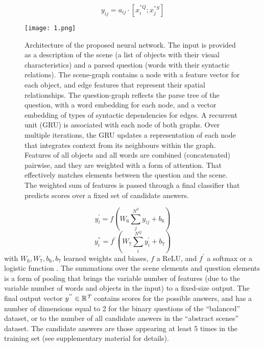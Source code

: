 \documentclass[10pt,twocolumn,a4paper]{article}
\begin{document}
  \begin{equation}
  y_{ij}=a_{ij}\cdot \left[x_i^{''Q};x_j^{''S} \right]
  \label{eq1}
  \end{equation}
  \begin{figure*}[htbp]
  \centering
  \texttt{[image: 1.png]}
  \caption{ Architecture of the proposed neural network. The input is provided as a description of the scene (a list of objects with their visual characteristics) and a parsed question (words with their syntactic relations). The scene-graph contains a node with a feature vector for each object, and edge features that represent their spatial relationships. The question-graph reﬂects the parse tree of the question, with a word embedding for each node, and a vector embedding of types of syntactic dependencies for edges. A recurrent unit (GRU) is associated with each node of both graphs. Over multiple iterations, the GRU updates a representation of each node that integrates context from its neighbours within the graph. Features of all objects and all words are combined (concatenated) pairwise, and they are weighted with a form of attention. That effectively matches elements between the question and the scene. The weighted sum of features is passed through a ﬁnal classiﬁer that predicts scores over a ﬁxed set of candidate answers.}
  \label{fig1}
 \end{figure*}
  \begin{equation}
  y_i^{'}=f \left( W_6\sum_{j}^{N^S}y_{ij}+b_6\right)
  \label{eq2}
  \end{equation}
  \begin{equation}
  y_i^{''}=f^{'}\left( W_7\sum_{i}^{N^Q}y_i^{'}+b_7\right)
  \label{eq3}
  \end{equation}
  with $W_6,W_7,b_6,b_7$ learned weights and biases, $f$ a ReLU, and $f^{'}$ a softmax
  or a logistic function . The summations over
  the scene elements and question elements is a form of pooling that brings the
   variable number of features (due to the variable number of words and objects in the input)
    to a ﬁxed-size output. The ﬁnal output vector $y^{''}\in \mathbb{R^{\emph{T}}}$ contains scores
     for the possible answers, and has a number of dimensions equal to 2 for the binary questions
     of the “balanced” dataset, or to the number of all candidate answers
     in the “abstract scenes” dataset. The candidate answers are those appearing at least 5 times
      in the training set (see supplementary material for details).

   
   
\end{document}
